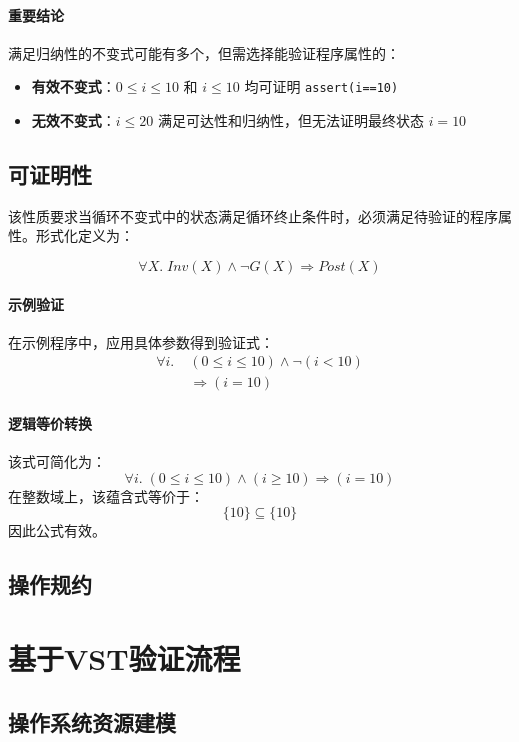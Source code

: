 \paragraph{重要结论}
满足归纳性的不变式可能有多个，但需选择能验证程序属性的：
\begin{itemize}
    \item \textbf{有效不变式}：$0 \leq i \leq 10$ 和 $i \leq 10$ 均可证明 \texttt{assert(i==10)}
    \item \textbf{无效不变式}：$i \leq 20$ 满足可达性和归纳性，但无法证明最终状态 $i=10$
\end{itemize}

\subsection*{可证明性}
该性质要求当循环不变式中的状态满足循环终止条件时，必须满足待验证的程序属性。形式化定义为：

\begin{equation}
\forall X.\; \mathit{Inv}(X) \land \neg G(X) \Rightarrow \mathit{Post}(X)
\end{equation}

\paragraph{示例验证}
在示例程序中，应用具体参数得到验证式：
\begin{align*}
\forall i.\; &(0 \leq i \leq 10) \land \neg(i < 10) \\
&\Rightarrow (i = 10)
\end{align*}

\paragraph{逻辑等价转换} 该式可简化为：
$$
\forall i.\; (0 \leq i \leq 10) \land (i \geq 10) \Rightarrow (i = 10)
$$
在整数域上，该蕴含式等价于：
$$
\{10\} \subseteq \{10\}
$$
因此公式有效。

\subsection{操作规约}
\section{基于VST验证流程}
\subsection{操作系统资源建模}

